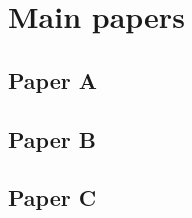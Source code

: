 \chapter{Main papers}
\label{chapter:annexPapers}

\section{Paper A}

\label{annex:PaperA}


\label{annex:PaperASup}


\section{Paper B}
\label{annex:PaperB}


%

\section{Paper C}

\label{annex:PaperC}



